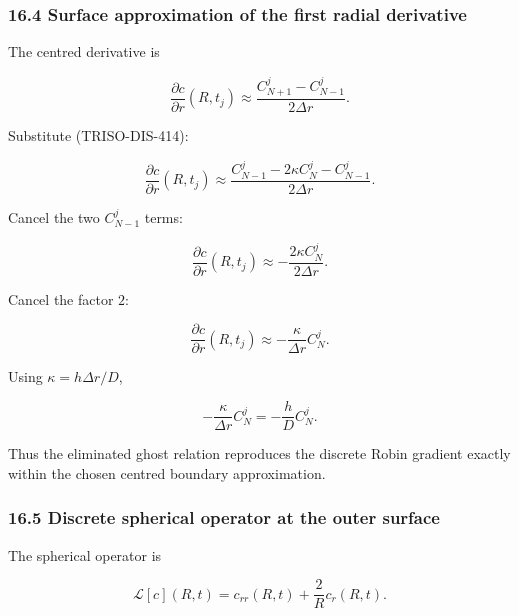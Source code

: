\documentclass[11pt,a4paper]{article}
\begin{document}
\subsubsection*{16.4 Surface approximation of the first radial derivative}

The centred derivative is

\begin{equation}
\frac{\partial c}{\partial r}(R,t_j)
\approx
\frac{
C_{N+1}^j-C_{N-1}^j
}{
2\Delta r
}.
\tag{TRISO-DIS-420}
\label{eq:triso-dis-420}
\end{equation}

Substitute (TRISO-DIS-414):

\begin{equation}
\frac{\partial c}{\partial r}(R,t_j)
\approx
\frac{
C_{N-1}^j
-
2\kappa C_N^j
-
C_{N-1}^j
}{
2\Delta r
}.
\tag{TRISO-DIS-421}
\label{eq:triso-dis-421}
\end{equation}

Cancel the two $C_{N-1}^j$ terms:

\begin{equation}
\frac{\partial c}{\partial r}(R,t_j)
\approx
-\frac{
2\kappa C_N^j
}{
2\Delta r
}.
\tag{TRISO-DIS-422}
\label{eq:triso-dis-422}
\end{equation}

Cancel the factor $2$:

\begin{equation}
\boxed{
\frac{\partial c}{\partial r}(R,t_j)
\approx
-\frac{\kappa}{\Delta r}C_N^j.
}
\tag{TRISO-DIS-423}
\label{eq:triso-dis-423}
\end{equation}

Using $\kappa=h\Delta r/D$,

\begin{equation}
-\frac{\kappa}{\Delta r}C_N^j
=
-\frac hD C_N^j.
\tag{TRISO-DIS-424}
\label{eq:triso-dis-424}
\end{equation}

Thus the eliminated ghost relation reproduces the discrete Robin gradient exactly within the chosen centred boundary approximation.

\subsubsection*{16.5 Discrete spherical operator at the outer surface}

The spherical operator is

\begin{equation}
\mathcal L[c](R,t)
=
c_{rr}(R,t)
+
\frac2R c_r(R,t).
\tag{TRISO-DIS-425}
\label{eq:triso-dis-425}
\end{equation}
\end{document}
